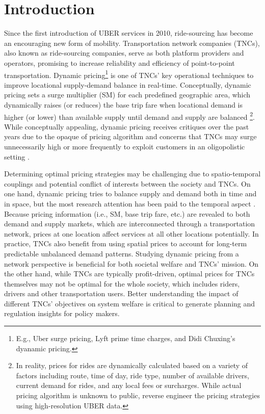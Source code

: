 \documentclass[review]{elsarticle}
\begin{document}

\section{Introduction}

Since the first introduction of UBER services in 2010, ride-sourcing has become an encouraging new form of mobility. Transportation network companies (TNCs), also known as ride-sourcing companies, serve as both platform providers and operators, promising to increase reliability and efficiency of point-to-point transportation. Dynamic pricing\footnote{E.g., Uber surge pricing, Lyft prime time charges, and Didi Chuxing's dyanamic pricing.} is one of TNCs' key operational techniques to improve locational supply-demand balance in real-time. Conceptually, dynamic pricing sets a surge multiplier (SM) for each predefined geographic area, which dynamically raises (or reduces) the base trip fare when locational demand is higher (or lower) than available supply until demand and supply are balanced \footnote{In reality, prices for rides are dynamically calculated based on a variety of factors including route, time of day, ride type, number of available drivers, current demand for rides, and any local fees or surcharges. While actual pricing algorithm is unknown to public, \cite{chen2015peeking} reverse engineer the pricing strategies using high-resolution UBER data.}. While conceptually appealing, dynamic pricing receives critiques over the past years due to the opaque of pricing algorithm and concerns that TNCs may surge unnecessarily high or more frequently to exploit customers in an oligopolistic setting \citep{zha2018surge}. 

Determining optimal pricing strategies may be challenging due to spatio-temporal couplings and potential conflict of interests between the society and TNCs. On one hand, dynamic pricing tries to balance supply and demand both in time and in space, but the most research attention has been paid to the temporal aspect \citep{bimpikis2019spatial}. Because pricing information (i.e., SM, base trip fare, etc.) are revealed to both demand and supply markets, which are interconnected through a transportation network, prices at one location affect services at all other locations potentially. In practice, TNCs also benefit from using spatial prices to account for long-term predictable unbalanced demand patterns\citep{bimpikis2019spatial}. Studying dynamic pricing from a network perspective is beneficial for both societal welfare and TNCs' mission. On the other hand, while TNCs are typically profit-driven, optimal prices for TNCs themselves may not be optimal for the whole society, which includes riders, drivers and other transportation users. Better understanding the impact of different TNCs' objectives on system welfare is critical to generate planning and regulation insights for policy makers.
\end{document}
